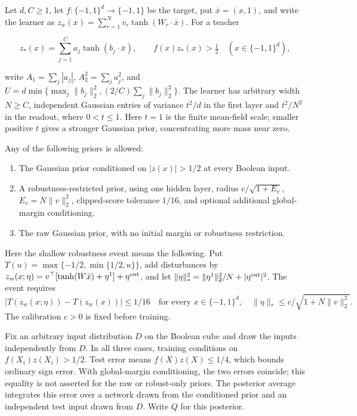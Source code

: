 \documentclass[11pt]{article}
\providecommand{\tightlist}{\setlength{\itemsep}{0pt}\setlength{\parskip}{0pt}}
\begin{document}
Let \(d,C\ge1\), let \(f:\{-1,1\}^d\to\{-1,1\}\) be the target,
put \(\bar x=(x,1)\), and write the learner as
\(z_w(x)=\sum_{r=1}^N v_r\tanh(W_r\cdot\bar x)\). For a teacher

\[
z_*(x)=\sum_{j=1}^{C}a_j\tanh(b_j\cdot\bar x),\qquad
f(x)z_*(x)>\tfrac12\quad(x\in\{-1,1\}^d),
\]

write \(A_1=\sum_j|a_j|\), \(A_2^2=\sum_j a_j^2\), and
\(U=d\min\{\max_j\|b_j\|_2^2,(2/C)\sum_j\|b_j\|_2^2\}\). The learner has
arbitrary width \(N\ge C\), independent Gaussian entries of variance
\(t^2/d\) in the first layer and \(t^2/N^2\) in the readout, where
\(0<t\le1\).
Here \(t=1\) is the finite mean-field scale; smaller positive \(t\)
gives a stronger Gaussian prior, concentrating more mass near zero.

Any of the following priors is allowed:

\begin{enumerate}
\def\labelenumi{\arabic{enumi}.}
\tightlist
\item
  The Gaussian prior conditioned on \(|z(x)|>1/2\) at every Boolean
  input.
\item
  A robustness-restricted prior, using one hidden layer, radius
  \(c/\sqrt{1+E_v}\), \(E_v=N\|v\|_2^2\), clipped-score tolerance
  \(1/16\), and optional additional global-margin conditioning.
\item
  The raw Gaussian prior, with no initial margin or robustness
  restriction.
\end{enumerate}

Here the shallow robustness event means the following. Put
\(T(u)=\max\{-1/2,\min\{1/2,u\}\}\), add disturbances by
\(z_w(x;\eta)=v^\top[\tanh(W\bar x)+\eta^1]+\eta^{\rm out}\), and let
\(\|\eta\|_*^2=\|\eta^1\|_2^2/N+|\eta^{\rm out}|^2\).
The event requires
\[
 |T(z_w(x;\eta))-T(z_w(x))|\le1/16
 \quad\text{for every }x\in\{-1,1\}^d,
 \quad\|\eta\|_*\le c/\sqrt{1+N\|v\|_2^2}.
\]
The calibration \(c>0\) is fixed before training.

Fix an arbitrary input distribution \(D\) on the Boolean cube and draw the inputs independently from \(D\). In all three cases, training conditions on \(f(X_i)z(X_i)>1/2\). Test
error means \(f(X)z(X)\le1/4\), which bounds ordinary sign error. With
global-margin conditioning, the two errors coincide; this equality is
not asserted for the raw or robust-only priors.
The posterior average integrates this error over a network drawn from the
conditioned prior and an independent test input drawn from \(D\). Write
\(Q\) for this posterior.
\end{document}
